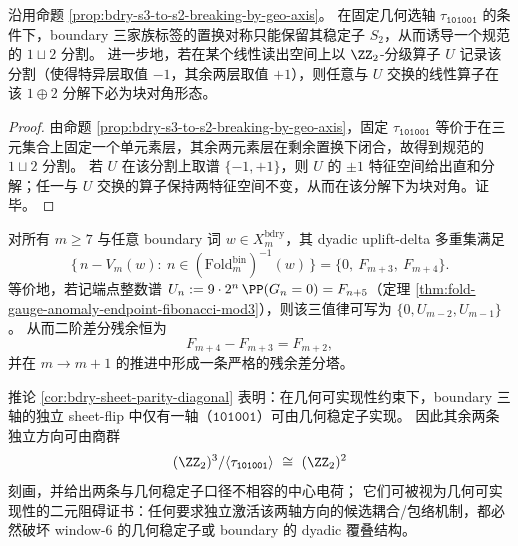 \begin{corollary}\label{cor:bdry-geo-axis-two-plus-one-family-splitting}
沿用命题 \ref{prop:bdry-s3-to-s2-breaking-by-geo-axis}。
在固定几何选轴 \(\tau_{\texttt{101001}}\) 的条件下，boundary 三家族标签的置换对称只能保留其稳定子 \(S_2\)，从而诱导一个规范的 \(1\sqcup 2\) 分割。
进一步地，若在某个线性读出空间上以 \(\ZZ_2\)-分级算子 \(U\) 记录该分割（使得特异层取值 \(-1\)，其余两层取值 \(+1\)），则任意与 \(U\) 交换的线性算子在该 \(1\oplus 2\) 分解下必为块对角形态。
\end{corollary}
\begin{proof}
由命题 \ref{prop:bdry-s3-to-s2-breaking-by-geo-axis}，固定 \(\tau_{\texttt{101001}}\) 等价于在三元集合上固定一个单元素层，其余两元素层在剩余置换下闭合，故得到规范的 \(1\sqcup 2\) 分割。
若 \(U\) 在该分割上取谱 \(\{-1,+1\}\)，则 \(U\) 的 \(\pm1\) 特征空间给出直和分解；任一与 \(U\) 交换的算子保持两特征空间不变，从而在该分解下为块对角。证毕。
\end{proof}

\begin{conjecture}\label{conj:bdry-uplift-fibonacci-three-value-law}
对所有 \(m\ge 7\) 与任意 boundary 词 \(w\in X_m^{\mathrm{bdry}}\)，其 dyadic uplift-delta 多重集满足
\[
\{\,n-V_m(w):\ n\in(\mathrm{Fold}^{\mathrm{bin}}_m)^{-1}(w)\,\}=\{0,\ F_{m+3},\ F_{m+4}\}.
\]
等价地，若记端点整数谱 \(U_n:=9\cdot 2^n\,\PP(G_n=0)=F_{n+5}\)（定理 \ref{thm:fold-gauge-anomaly-endpoint-fibonacci-mod3}），则该三值律可写为 \(\{0,U_{m-2},U_{m-1}\}\)。
从而二阶差分残余恒为
\[
F_{m+4}-F_{m+3}=F_{m+2},
\]
并在 \(m\to m+1\) 的推进中形成一条严格的残余差分塔。
\end{conjecture}

\begin{remark}[两条不可几何实现的剩余中心电荷]\label{rem:bdry-nongeometric-two-charges}
推论 \ref{cor:bdry-sheet-parity-diagonal} 表明：在几何可实现性约束下，boundary 三轴的独立 sheet-flip 中仅有一轴（\(\texttt{101001}\)）可由几何稳定子实现。
因此其余两条独立方向可由商群
\[
(\ZZ_2)^3/\langle\tau_{\texttt{101001}}\rangle\ \cong\ (\ZZ_2)^2
\]
刻画，并给出两条与几何稳定子口径不相容的中心电荷；
它们可被视为几何可实现性的二元阻碍证书：任何要求独立激活该两轴方向的候选耦合/包络机制，都必然破坏 window-\(6\) 的几何稳定子或 boundary 的 dyadic 覆叠结构。
\end{remark}

